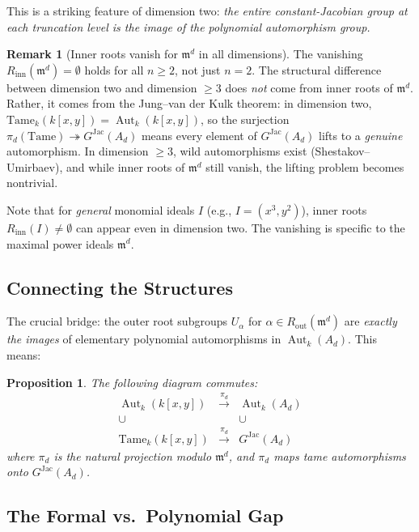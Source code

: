 \documentclass[12pt,a4paper]{article}
\newtheorem{proposition}[theorem]{Proposition}
\theoremstyle{definition}
\newtheorem{remark}[theorem]{Remark}
\newcommand{\kk}{k}
\newcommand{\pp}{\mathfrak{m}}
\newcommand{\Aut}{\operatorname{Aut}}
\newcommand{\GJac}{G^{\mathrm{Jac}}}
\begin{document}
This is a striking feature of dimension two: \emph{the entire constant-Jacobian
group at each truncation level is the image of the polynomial automorphism group.}

\begin{remark}[Inner roots vanish for $\pp^d$ in all dimensions]
The vanishing $R_{\mathrm{inn}}(\pp^d) = \emptyset$ holds for all $n \geq 2$,
not just $n = 2$. The structural difference between dimension two and
dimension $\geq 3$ does \emph{not} come from inner roots of $\pp^d$. Rather, it
comes from the Jung--van der Kulk theorem: in dimension two,
$\mathrm{Tame}_\kk(\kk[x,y]) = \Aut_\kk(\kk[x,y])$, so the surjection
$\pi_d(\mathrm{Tame}) \twoheadrightarrow \GJac(A_d)$ means every element of
$\GJac(A_d)$ lifts to a \emph{genuine} automorphism. In dimension $\geq 3$,
wild automorphisms exist (Shestakov--Umirbaev), and while inner roots of $\pp^d$
still vanish, the lifting problem becomes nontrivial.

Note that for \emph{general} monomial ideals $I$ (e.g., $I = (x^3, y^2)$),
inner roots $R_{\mathrm{inn}}(I) \neq \emptyset$ can appear even in dimension two.
The vanishing is specific to the maximal power ideals $\pp^d$.
\end{remark}

\subsection{Connecting the Structures}

The crucial bridge: the outer root subgroups $U_\alpha$ for $\alpha \in R_{\mathrm{out}}(\pp^d)$
are \emph{exactly the images} of elementary polynomial automorphisms in $\Aut_\kk(A_d)$.
This means:

\begin{proposition}
The following diagram commutes:
\[
\begin{array}{ccc}
\Aut_\kk(\kk[x,y]) & \xrightarrow{\pi_d} & \Aut_\kk(A_d) \\
\cup & & \cup \\
\mathrm{Tame}_\kk(\kk[x,y]) & \xrightarrow{\pi_d} & \GJac(A_d)
\end{array}
\]
where $\pi_d$ is the natural projection modulo $\pp^d$, and $\pi_d$ maps tame automorphisms
\emph{onto} $\GJac(A_d)$.
\end{proposition}

\subsection{The Formal vs.\ Polynomial Gap}
\end{document}

